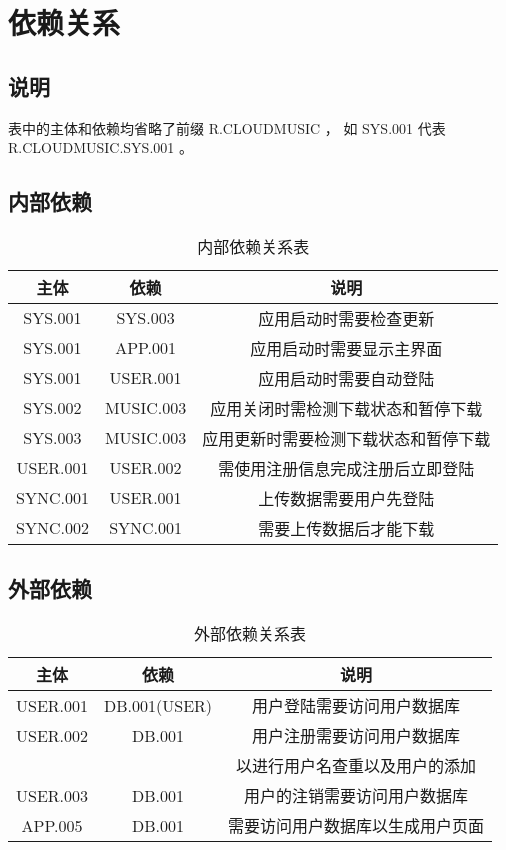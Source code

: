 \chapter{依赖关系}

\section{说明}

    表中的主体和依赖均省略了前缀 R.CLOUDMUSIC ，
    如 SYS.001 代表 R.CLOUDMUSIC.SYS.001 。

\section{内部依赖}
\begin{table}[h]
    \caption {内部依赖关系表}
    \begin{tabular}{|c|c|c|}
        \hline
        主体 & 依赖 & 说明\\
        \hline
        SYS.001 & SYS.003 & 应用启动时需要检查更新\\
        \hline
        SYS.001 & APP.001 & 应用启动时需要显示主界面\\
        \hline
        SYS.001 & USER.001 & 应用启动时需要自动登陆\\
        \hline
        SYS.002 & MUSIC.003 & 应用关闭时需检测下载状态和暂停下载\\
        \hline
        SYS.003 & MUSIC.003 & 应用更新时需要检测下载状态和暂停下载\\
        \hline
        USER.001 & USER.002 & 需使用注册信息完成注册后立即登陆\\
        \hline
        SYNC.001 & USER.001 & 上传数据需要用户先登陆\\
        \hline
        SYNC.002 & SYNC.001 & 需要上传数据后才能下载\\
        \hline
    \end{tabular}
\end{table}

\section{外部依赖}
\begin{table}[h]
    \caption {外部依赖关系表}
    \begin{tabular}{|c|c|c|}
        \hline
        主体 & 依赖 & 说明\\
        \hline
        USER.001 & DB.001(USER) & 用户登陆需要访问用户数据库\\
        \hline
        USER.002 & DB.001 & 用户注册需要访问用户数据库\\
        & & 以进行用户名查重以及用户的添加\\
        \hline
        USER.003 & DB.001 & 用户的注销需要访问用户数据库\\
        \hline
        APP.005 & DB.001 & 需要访问用户数据库以生成用户页面\\
        \hline
    \end{tabular}
\end{table}
